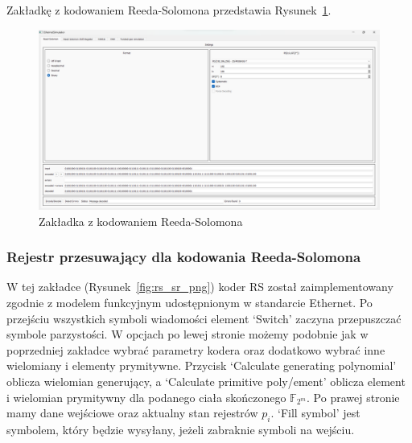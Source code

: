 Zakładkę z kodowaniem Reeda-Solomona przedstawia Rysunek~\ref{fig:rs_png}.

\begin{figure}[H]
    \centering
    \includegraphics[width=\textwidth]{images/rs.png}
    \caption{Zakładka z kodowaniem Reeda-Solomona}
    \label{fig:rs_png}
\end{figure}

\subsubsection{Rejestr przesuwający dla kodowania Reeda-Solomona}

W tej zakładce (Rysunek~\ref{fig:rs_sr_png}) koder RS został zaimplementowany zgodnie z modelem
funkcyjnym udostępnionym w standarcie Ethernet. Po przejściu
wszystkich symboli wiadomości element `Switch' zaczyna przepuszczać symbole parzystości.
W opcjach po lewej stronie możemy podobnie jak w poprzedniej zakładce wybrać
parametry kodera oraz dodatkowo wybrać inne wielomiany i elementy prymitywne. Przycisk `Calculate generating polynomial' oblicza
wielomian generujący, a `Calculate primitive poly/ement' oblicza element i wielomian prymitywny dla podanego ciała skończonego $\mathbb{F}_{2^m}$.
Po prawej stronie mamy dane wejściowe oraz aktualny stan rejestrów $p_i$. `Fill symbol' jest symbolem, który będzie wysyłany, jeżeli zabraknie symboli na wejściu.

